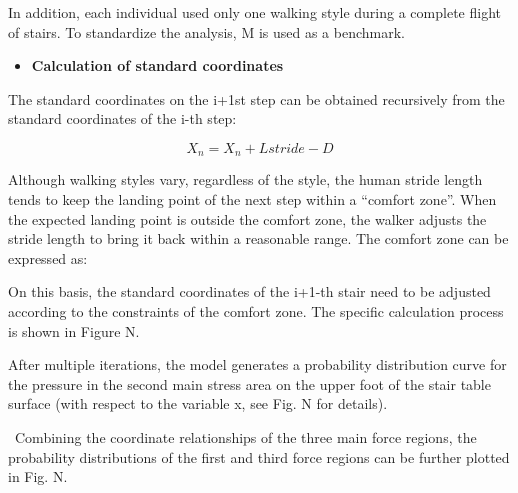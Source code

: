 \documentclass{mcmthesis}
\begin{document}
In addition, each individual used only one walking style during a complete flight of stairs. To standardize the analysis, M is used as a benchmark.

\begin{itemize}[label=$\diamond$]
\item \textbf{Calculation of standard coordinates}
\end{itemize}

The standard coordinates on the i+1st step can be obtained recursively from the standard coordinates of the i-th step:

\[
X_n = X_n + Lstride - D
\]


Although walking styles vary, regardless of the style, the human stride length tends to keep the landing point of the next step within a “comfort zone”. When the expected landing point is outside the comfort zone, the walker adjusts the stride length to bring it back within a reasonable range. The comfort zone can be expressed as:

On this basis, the standard coordinates of the i+1-th stair need to be adjusted according to the constraints of the comfort zone. The specific calculation process is shown in Figure N. 

After multiple iterations, the model generates a probability distribution curve for the pressure in the second main stress area on the upper foot of the stair table surface (with respect to the variable x, see Fig. N for details).

 Combining the coordinate relationships of the three main force regions, the probability distributions of the first and third force regions can be further plotted in Fig. N.
\end{document}
